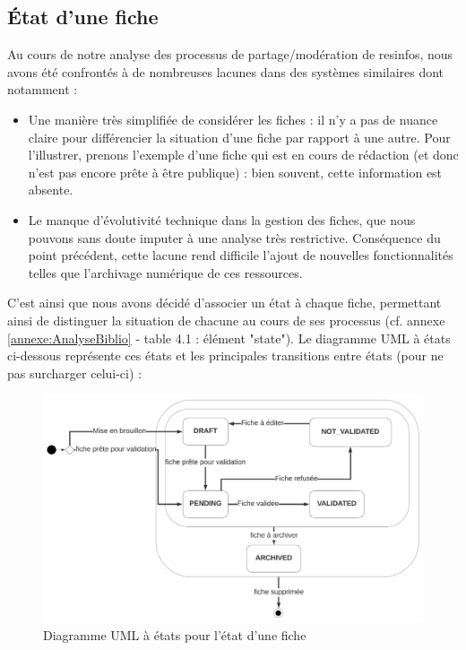 \pagebreak
\subsection*{État d'une \gls{fiche}}

Au cours de notre analyse des processus de partage/modération de \glspl{resinfo}, nous avons été confrontés à de nombreuses lacunes dans des systèmes similaires dont notamment :
\begin{itemize}
    \item Une manière très simplifiée de considérer les \glspl{fiche} : il n'y a pas de nuance claire pour différencier la situation d'une \gls{fiche} par rapport à une autre. Pour l'illustrer, prenons l'exemple d'une \gls{fiche} qui est en cours de rédaction (et donc n'est pas encore prête à être publique) : bien souvent, cette information est absente.
    \item Le manque d'évolutivité technique dans la gestion des \glspl{fiche}, que nous pouvons sans doute imputer à une analyse très restrictive. Conséquence du point précédent, cette lacune rend difficile l'ajout de nouvelles fonctionnalités telles que l'archivage numérique de ces ressources. 
\end{itemize}

C'est ainsi que nous avons décidé d'associer un état à chaque \gls{fiche}, permettant ainsi de distinguer la situation de chacune au cours de ses processus (cf. annexe \ref{annexe:AnalyseBiblio} - table 4.1 : élément "state"). 
Le diagramme UML à états ci-dessous représente ces états et les principales transitions entre états (pour ne pas surcharger celui-ci) :

\begin{figure}[H]
    \includegraphics[width=\textwidth,height=\textheight,keepaspectratio]{images/cahierDesCharges/StateFiches.png}
    \centering
    \caption{Diagramme UML à états pour l'état d'une \gls{fiche}}
    \label{pic:stateDiagramForFiches}
\end{figure}


